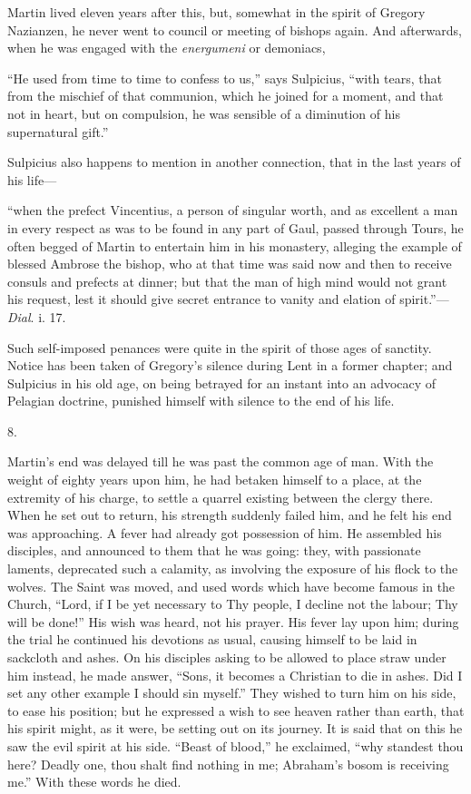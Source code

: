 Martin lived eleven years after this, but, somewhat in the spirit
of Gregory Nazianzen, he never went to council or meeting of bishops
again. And afterwards, when he was engaged with the \emph{energumeni}
or demoniacs,

``He used from time to time to confess to us,'' says
Sulpicius, ``with tears, that from the mischief of that communion,
which he joined for a moment, and that not in heart, but on
compulsion, he was sensible of a diminution of his supernatural
gift.''

Sulpicius also happens to mention in another connection, that in
the last years of his life—

``when the prefect Vincentius, a person of singular worth, and
as excellent a man in every respect as was to be found in any part of
Gaul, passed through Tours, he often begged of Martin to entertain him
in his monastery, alleging the example of blessed Ambrose the bishop,
who at that time was said now and then to receive consuls and prefects
at dinner; but that the man of high mind would not grant his request,
lest it should give secret entrance to vanity and elation of
spirit.''—\emph{Dial}. i. 17.

Such self-imposed penances were quite in the spirit of those ages
of sanctity. Notice has been taken of Gregory's silence during Lent in
a former chapter; and Sulpicius in his old age, on being betrayed for
an instant into an advocacy of Pelagian doctrine, punished himself
with silence to the end of his life.

8.

Martin's end was delayed till he was past the common age of man.
With the weight of eighty years upon him, he had betaken himself to a
place, at the extremity of his charge, to settle a quarrel existing
between the clergy there. When he set out to return, his strength
suddenly failed him, and he felt his end was approaching. A
fever had already got possession of him. He assembled his disciples,
and announced to them that he was going: they, with passionate
laments, deprecated such a calamity, as involving the exposure of his
flock to the wolves. The Saint was moved, and used words which have
become famous in the Church, ``Lord, if I be yet necessary to Thy
people, I decline not the labour; Thy will be done!'' His wish was
heard, not his prayer. His fever lay upon him; during the trial he
continued his devotions as usual, causing himself to be laid in
sackcloth and ashes. On his disciples asking to be allowed to place
straw under him instead, he made answer, ``Sons, it becomes a
Christian to die in ashes. Did I set any other example I should sin
myself.'' They wished to turn him on his side, to ease his
position; but he expressed a wish to see heaven rather than earth,
that his spirit might, as it were, be setting out on its journey. It
is said that on this he saw the evil spirit at his side. ``Beast
of blood,'' he exclaimed, ``why standest thou here? Deadly
one, thou shalt find nothing in me; Abraham's bosom is receiving
me.'' With these words he died.

